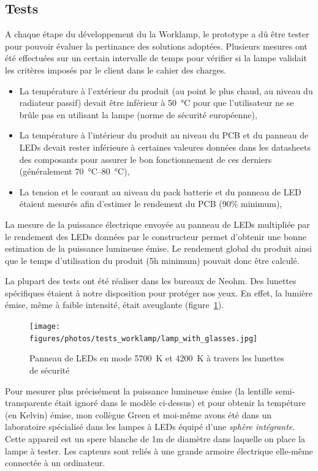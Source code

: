 \documentclass[a4paper, 11pt]{report}
\begin{document}
\subsection{Tests}
A chaque étape du développement du la Worklamp, le prototype a dû  être tester pour pouvoir évaluer la pertinance des solutions adoptées. Plusieurs mesures ont été effectuées sur un certain intervalle de temps pour vérifier si la lampe validait les critères imposés par le client dans le cahier des charges.
\begin{itemize} %
\item La température à l'extérieur du produit (au point le plus chaud, au niveau du radiateur passif) devait être inférieur à \SI{50}{\celsius} pour que l'utilisateur ne se brûle pas en utilisant la lampe (norme de sécurité européenne),
\item La température à l'intérieur du produit au niveau du PCB et du panneau de LEDs devait rester inférieure à certaines valeures données dans les datasheets des composants pour assurer le bon fonctionnement de ces derniers (généralement \SIrange{70}{80}{\celsius}),
\item La tension et le courant au niveau du pack batterie et du panneau de LED étaient mesurés afin d'estimer le rendement du PCB (90\% minimum),
\end{itemize}
La mesure de la puissance électrique envoyée au panneau de LEDs multipliée par le rendement des LEDs données par le constructeur permet d'obtenir une bonne estimation de la puissance lumineuse émise. Le rendement global du produit ainsi que le temps d'utilisation du produit (5h minimum) pouvait donc être calculé.

La plupart des tests ont été réaliser dans les bureaux de Neohm. Des lunettes spécifiques étaient à notre disposition pour protéger nos yeux. En effet, la lumière émise, même à faible intensité, était aveuglante (figure~\ref{fig:lamp_with_glasses}).

\begin{figure}[!h]
\begin{center}
\texttt{[image: figures/photos/tests\_worklamp/lamp\_with\_glasses.jpg]}
\end{center}
\caption{Panneau de LEDs en mode \SI{5700}{\kelvin} et \SI{4200}{\kelvin} à travers les lunettes de sécurité}
\label{fig:lamp_with_glasses}
\end{figure}

Pour mesurer plus précisément la puissance lumineuse émise (la lentille semi-transparente était ignoré dans le modèle ci-dessus) et pour obtenir la tempéture (en Kelvin) émise, mon collègue Green et moi-même avons été dans un laboratoire spécialisé dans les lampes à LEDs équipé d'une \emph{sphère intégrante}. Cette appareil est un spere blanche de 1m de diamètre dans laquelle on place la lampe à tester. Les capteurs sont reliés à une grande armoire électrique elle-même connectée à un ordinateur.
\end{document}
